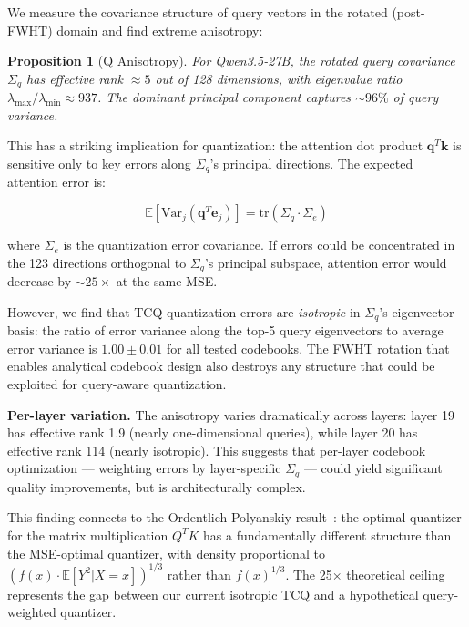\documentclass{article}
\newtheorem{proposition}{Proposition}
\newcommand{\E}{\mathbb{E}}
\newcommand{\Var}{\mathrm{Var}}
\begin{document}
We measure the covariance structure of query vectors in the rotated
(post-FWHT) domain and find extreme anisotropy:

\begin{proposition}[Q Anisotropy]
For Qwen3.5-27B, the rotated query covariance $\Sigma_q$ has effective rank
$\approx 5$ out of 128 dimensions, with eigenvalue ratio
$\lambda_{\max}/\lambda_{\min} \approx 937$. The dominant principal component
captures $\sim 96\%$ of query variance.
\end{proposition}

This has a striking implication for quantization: the attention dot product
$\mathbf{q}^T \mathbf{k}$ is sensitive only to key errors along $\Sigma_q$'s
principal directions. The expected attention error is:

\begin{equation}
\E\left[\Var_j(\mathbf{q}^T \mathbf{e}_j)\right] =
\mathrm{tr}(\Sigma_q \cdot \Sigma_e)
\end{equation}

where $\Sigma_e$ is the quantization error covariance. If errors could be
concentrated in the 123 directions orthogonal to $\Sigma_q$'s principal
subspace, attention error would decrease by $\sim 25\times$ at the same MSE.

However, we find that TCQ quantization errors are \emph{isotropic} in
$\Sigma_q$'s eigenvector basis: the ratio of error variance along the top-5
query eigenvectors to average error variance is $1.00 \pm 0.01$ for all tested
codebooks. The FWHT rotation that enables analytical codebook design also
destroys any structure that could be exploited for query-aware quantization.

\textbf{Per-layer variation.} The anisotropy varies dramatically across layers:
layer 19 has effective rank 1.9 (nearly one-dimensional queries), while layer 20
has effective rank 114 (nearly isotropic). This suggests that per-layer
codebook optimization — weighting errors by layer-specific $\Sigma_q$ — could
yield significant quality improvements, but is architecturally
complex.

This finding connects to the Ordentlich-Polyanskiy result~\cite{ordentlich2024matmul}: the
optimal quantizer for the matrix multiplication $Q^T K$ has a fundamentally
different structure than the MSE-optimal quantizer, with density proportional to
$(f(x) \cdot \E[Y^2 | X = x])^{1/3}$ rather than $f(x)^{1/3}$. The 25$\times$
theoretical ceiling represents the gap between our current isotropic TCQ and a
hypothetical query-weighted quantizer.
\end{document}
